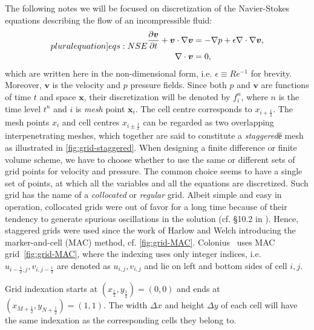 \documentclass{article}
\numberwithin{equation}{section}
\begin{document}
The following notes we will be focused on discretization of the Navier-Stokes equations describing the flow of an incompressible fluid:
\begin{subequations}
\label[pluralequation]{eqs:NSE}
\begin{align}
\label{eqn:momentum-intro}
\frac{\partial \boldsymbol{v}}{\partial t} + \boldsymbol{v} \cdot \nabla \boldsymbol{v} &= -\nabla p + \epsilon \nabla \cdot \nabla \boldsymbol{v}, \\
\label{eqn:continuity}
\nabla \cdot \boldsymbol{v} &= 0,
\end{align}
\end{subequations}
which are written here in the non-dimensional form, i.e. $\epsilon \equiv Re^{-1}$ for brevity. Moreover, $\boldsymbol{v}$ is the velocity and $p$ pressure fields. 
Since both $p$ and $\boldsymbol{v}$ are functions of time $t$ and space $\boldsymbol{x}$, their discretization will be denoted by $f^{n}_{i}$, where $n$ is the time level $t^{n}$ and $i$ is \textit{mesh} point $\boldsymbol{x}_{i}$. 
The cell centre corresponds to $x_{i+\frac{1}{2}}$. 
The mesh points $x_{i}$ and cell centres $x_{i \pm \frac{1}{2}}$ can be regarded as two overlapping interpenetrating meshes, which together are said to constitute a \textit{staggered}ё mesh as illustrated in \cref{fig:grid-staggered}. 
When designing a finite difference or finite volume scheme, we have to choose whether to use the same or different sets of grid points for velocity and pressure. 
The common choice seems to have a single set of points, at which all the variables and all the equations are discretized. 
Such grid has the name of a \textit{collocated} or \textit{regular} grid. 
Albeit simple and easy in operation, collocated grids were out of favor for a long time because of their tendency to generate spurious oscillations in the solution (cf. \S 10.2 in \cite{Zikanov:2010}). Hence, staggered grids were used since the work of Harlow and Welch \cite{Harlow:1965} introducing the marker-and-cell (MAC) method, cf. \cref{fig:grid-MAC}. 
Colonius~\cite{Colonius:2008} uses MAC grid~\cref{fig:grid-MAC}, where the indexing uses only integer indices, i.e.  $u_{i-\frac{1}{2},j},v_{i,j-\frac{1}{2}}$ are denoted as $u_{i,j},v_{i,j}$ and lie on left and bottom sides of cell $i,j$.  


Grid indexation starts at $(x_{\frac{1}{2}},y_{\frac{1}{2}})=(0,0)$ and ends at $(x_{M+\frac{1}{2}},y_{N+\frac{1}{2}})=(1,1)$. 
	The width $\Delta x$ and height $\Delta y$ of each cell will have the same indexation as the corresponding cells they belong to. 
\end{document}
